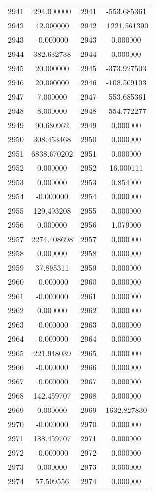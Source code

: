 \documentclass[12pt]{article}
\begin{document}
\begin{longtable}{@{}cccc@{}}
2941 & 294.000000 & 2941 & -553.685361 \\
2942 & 42.000000 & 2942 & -1221.561390 \\
2943 & -0.000000 & 2943 & 0.000000 \\
2944 & 382.632738 & 2944 & 0.000000 \\
2945 & 20.000000 & 2945 & -373.927503 \\
2946 & 20.000000 & 2946 & -108.509103 \\
2947 & 7.000000 & 2947 & -553.685361 \\
2948 & 8.000000 & 2948 & -554.772277 \\
2949 & 90.680962 & 2949 & 0.000000 \\
2950 & 308.453468 & 2950 & 0.000000 \\
2951 & 6838.670202 & 2951 & 0.000000 \\
2952 & 0.000000 & 2952 & 16.000111 \\
2953 & 0.000000 & 2953 & 0.854000 \\
2954 & -0.000000 & 2954 & 0.000000 \\
2955 & 129.493208 & 2955 & 0.000000 \\
2956 & 0.000000 & 2956 & 1.079000 \\
2957 & 2274.408698 & 2957 & 0.000000 \\
2958 & 0.000000 & 2958 & 0.000000 \\
2959 & 37.895311 & 2959 & 0.000000 \\
2960 & -0.000000 & 2960 & 0.000000 \\
2961 & -0.000000 & 2961 & 0.000000 \\
2962 & 0.000000 & 2962 & 0.000000 \\
2963 & -0.000000 & 2963 & 0.000000 \\
2964 & -0.000000 & 2964 & 0.000000 \\
2965 & 221.948039 & 2965 & 0.000000 \\
2966 & -0.000000 & 2966 & 0.000000 \\
2967 & -0.000000 & 2967 & 0.000000 \\
2968 & 142.459707 & 2968 & 0.000000 \\
2969 & 0.000000 & 2969 & 1632.827830 \\
2970 & -0.000000 & 2970 & 0.000000 \\
2971 & 188.459707 & 2971 & 0.000000 \\
2972 & -0.000000 & 2972 & 0.000000 \\
2973 & 0.000000 & 2973 & 0.000000 \\
2974 & 57.509556 & 2974 & 0.000000 \\

\end{longtable}
\end{document}
